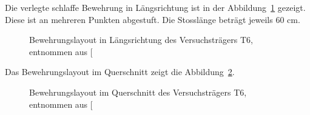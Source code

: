 \documentclass[
  11pt,
  letterpaper,
]{scrreprt}
\begin{document}
Die verlegte schlaffe Bewehrung in Längsrichtung ist in der
Abbildung~\ref{fig-bewehrung_laengs_t6} gezeigt. Diese ist an mehreren
Punkten abgestuft. Die Stosslänge beträgt jeweils \(60\) cm.

\begin{figure}[H]


\caption{\label{fig-bewehrung_laengs_t6}Bewehrungslayout in
Längsrichtung des Versuchsträgers T6, entnommen aus
{[}\citeproc{ref-sigrist_versuche_1993}{5}{]}}

\end{figure}%

Das Bewehrungslayout im Querschnitt zeigt die
Abbildung~\ref{fig-bewehrung_qs_t6}.

\begin{figure}[H]


\caption{\label{fig-bewehrung_qs_t6}Bewehrungslayout im Querschnitt des
Versuchsträgers T6, entnommen aus
{[}\citeproc{ref-sigrist_versuche_1993}{5}{]}}

\end{figure}%
\end{document}
